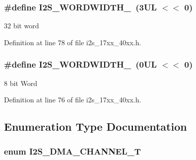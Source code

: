 \subsubsection[{\texorpdfstring{I2\+S\+\_\+\+W\+O\+R\+D\+W\+I\+D\+T\+H\+\_\+32}{I2S_WORDWIDTH_32}}]{\setlength{\rightskip}{0pt plus 5cm}\#define I2\+S\+\_\+\+W\+O\+R\+D\+W\+I\+D\+T\+H\+\_~(3\+U\+L $<$$<$ 0)}\hypertarget{group__I2S__17XX__40XX_ga683d81436e91c1631bdd5947ee78489b}{}\label{group__I2S__17XX__40XX_ga683d81436e91c1631bdd5947ee78489b}
32 bit word 

Definition at line 78 of file i2s\+\_\+17xx\+\_\+40xx.\+h.

\subsubsection[{\texorpdfstring{I2\+S\+\_\+\+W\+O\+R\+D\+W\+I\+D\+T\+H\+\_\+8}{I2S_WORDWIDTH_8}}]{\setlength{\rightskip}{0pt plus 5cm}\#define I2\+S\+\_\+\+W\+O\+R\+D\+W\+I\+D\+T\+H\+\_~(0\+U\+L $<$$<$ 0)}\hypertarget{group__I2S__17XX__40XX_ga17cb1a91d5be4e7afad486ead6d2980d}{}\label{group__I2S__17XX__40XX_ga17cb1a91d5be4e7afad486ead6d2980d}
8 bit Word 

Definition at line 76 of file i2s\+\_\+17xx\+\_\+40xx.\+h.



\subsection{Enumeration Type Documentation}
\subsubsection[{\texorpdfstring{I2\+S\+\_\+\+D\+M\+A\+\_\+\+C\+H\+A\+N\+N\+E\+L\+\_\+T}{I2S_DMA_CHANNEL_T}}]{\setlength{\rightskip}{0pt plus 5cm}enum {\bf I2\+S\+\_\+\+D\+M\+A\+\_\+\+C\+H\+A\+N\+N\+E\+L\+\_\+T}}\hypertarget{group__I2S__17XX__40XX_gac04c1583101ddd661886d9677683421b}{}\label{group__I2S__17XX__40XX_gac04c1583101ddd661886d9677683421b}



